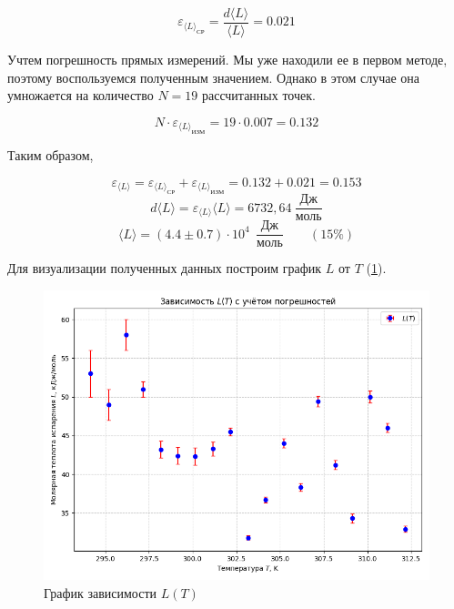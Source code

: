 \documentclass[a4paper,12pt]{article} %
\begin{document}
\begin{equation}
  \varepsilon_{{\langle L \rangle}_{\text{СР}}} = \frac{d\langle L \rangle}{\langle L \rangle} = 0.021
\end{equation}

Учтем погрешность прямых измерений. Мы уже находили ее в первом методе, поэтому воспользуемся полученным значением. Однако в этом случае она умножается на количество $N = 19$ рассчитанных точек.

\begin{equation}
  N \cdot \varepsilon_{{\langle L \rangle}_{\text{ИЗМ}}} = 19 \cdot 0.007 = 0.132
\end{equation}

Таким образом,

\begin{equation}
  \varepsilon_{{\langle L \rangle}} = \varepsilon_{{\langle L \rangle}_{\text{СР}}} + \varepsilon_{{\langle L \rangle}_{\text{ИЗМ}}} = 0.132 + 0.021 = 0.153
\end{equation}
\begin{equation}
  d\langle L \rangle = \varepsilon_{\langle L \rangle} \langle L \rangle = 6732,64\ \frac{\mbox{Дж}}{\mbox{моль}} 
\end{equation}
\begin{equation}
  \langle L \rangle = (4.4 \pm 0.7) \cdot 10^{4}\ \ \frac{\mbox{Дж}}{\mbox{моль}} \qquad (15\%)
\end{equation}

Для визуализации полученных данных построим график $L$ от $T$ (\ref{fig:graph3}).

\begin{figure}[h]
  \centering
  \includegraphics[scale = 0.75]{graph3.png}
  \caption{График зависимости $L(T)$}
  \label{fig:graph3}
\end{figure}
\end{document}

